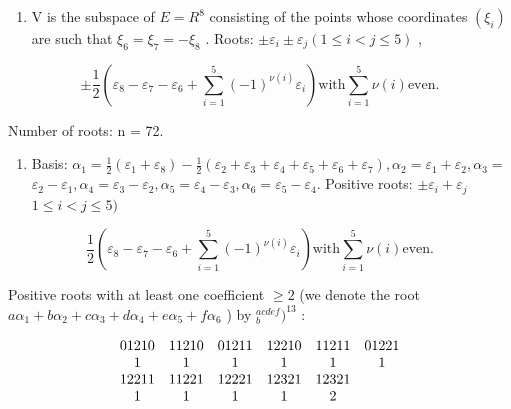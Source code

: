 
\begin{enumerate}
\def\labelenumi{(\Roman{enumi})}
\tightlist
\item
  V is the subspace of \(E = R^{8}\) consisting of the points whose coordinates \((\xi_{i})\) are such that \(\xi_{6} = \xi_{7} = -\xi_{8}\) . Roots: \(\pm\varepsilon_{i} \pm \varepsilon_{j} (1 \leqslant i < j \leqslant 5)\) ,
\end{enumerate}

\[
\pm \frac {1}{2} (\varepsilon_ {8} - \varepsilon_ {7} - \varepsilon_ {6} + \sum_ {i = 1} ^ {5} (- 1) ^ {\nu (i)} \varepsilon_ {i}) \text {with} \sum_ {i = 1} ^ {5} \nu (i) \text {even.}
\]

Number of roots: n = 72.

\begin{enumerate}
\def\labelenumi{(\Roman{enumi})}
\setcounter{enumi}{1}
\tightlist
\item
Basis: \(\alpha_{1} = \frac{1}{2} (\varepsilon_{1} + \varepsilon_{8}) - \frac{1}{2} (\varepsilon_{2} + \varepsilon_{3} + \varepsilon_{4} + \varepsilon_{5} + \varepsilon_{6} + \varepsilon_{7}),\alpha_{2} = \varepsilon_{1} + \varepsilon_{2},\alpha_{3} =\) \(\varepsilon_2 - \varepsilon_1,\alpha_4 = \varepsilon_3 - \varepsilon_2,\alpha_5 = \varepsilon_4 - \varepsilon_3,\alpha_6 = \varepsilon_5 - \varepsilon_4.\) Positive roots: \(\pm \varepsilon_i + \varepsilon_j\) \(1\leqslant i <   j\leqslant 5)\)
\end{enumerate}

\[
\frac {1}{2} \left(\varepsilon_ {8} - \varepsilon_ {7} - \varepsilon_ {6} + \sum_ {i = 1} ^ {5} (- 1) ^ {\nu (i)} \varepsilon_ {i}\right) \text {with} \sum_ {i = 1} ^ {5} \nu (i) \text {even}.
\]

Positive roots with at least one coefficient \(\geqslant 2\) (we denote the root \(a\alpha_{1} + b\alpha_{2} + c\alpha_{3} + d\alpha_{4} + e\alpha_{5} + f\alpha_{6}\) ) by \({ }^{a c d e f}_{b})^{13}\) :

\[
\begin{array}{c c c c c c} 0   1   2   1   0 & 1   1   2   1   0 & 0   1   2   1   1 & 1   2   2   1   0 & 1   1   2   1   1 & 0   1   2   2   1 \\ 1 & 1 & 1 & 1 & 1 & 1 \\ 1   2   2   1   1 & 1   1   2   2   1 & 1   2   2   2   1 & 1   2   3   2   1 & 1   2   3   2   1 \\ 1 & 1 & 1 & 1 & 2 \end{array}
\]

